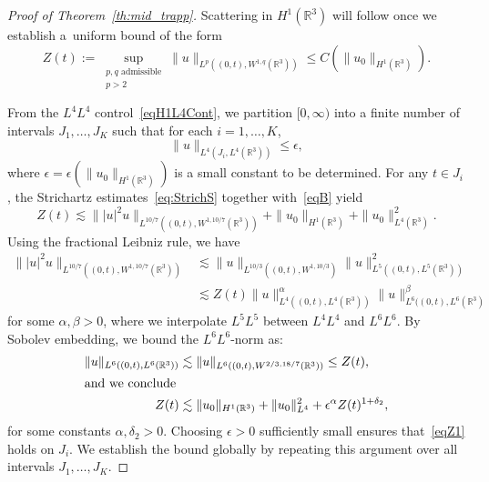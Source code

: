 \documentclass[AHL,Unicode,longabstracts,published]{cedram}
\newcommand*\R{\mathbb{R}}
\begin{document}
\begin{proof}[Proof of Theorem~\ref{th:mid_trapp}]
Scattering in $H^1(\R^3) $ will follow once we establish a~uniform bound of the form
\begin{equation}\label{eqZ1}
Z(t) := \sup_{\substack{p, q \text{ admissible}\\ p>2}} \| u \|_{L^p\left((0,t), W^{1,q}(\R^3)\right)} \leq C\left(\| u_0 \|_{H^1(\R^3)}\right).
\end{equation}

From the $L^4L^4$ control~\eqref{eqH1L4Cont}, we partition $[0, \infty)$ into a finite number of intervals $J_1, \dots, J_K $ such that for each $i = 1, \dots, K $,
\begin{equation*}
\| u \|_{L^4(J_i, L^4(\R^3))} \leq \epsilon,
\end{equation*}
where $\epsilon = \epsilon(\| u_0 \|_{H^1(\R^3)})$ is a small constant to be determined. For any $t \in J_i $, the Strichartz estimates~\eqref{eq:StrichS} together with~\eqref{eqB} yield
\begin{equation*}
Z(t) \lesssim \| |u|^2 u \|_{L^{10/7}\left((0,t), W^{1,10/7}(\R^3)\right)} + \| u_0 \|_{H^1(\R^3)} + \| u_0 \|_{L^4(\R^3)}^2.
\end{equation*}
Using the fractional Leibniz rule, we have
\begin{align*}
\| |u|^2 u \|_{L^{10/7}\left((0,t), W^{1,10/7}(\R^3)\right)} & \lesssim \| u \|_{L^{10/3}\left((0,t), W^{1,10/3}\right)} \| u \|_{L^5\left((0,t), L^5(\R^3)\right)}^2 \\
&\lesssim Z(t) \| u \|_{L^4\left((0,t), L^4(\R^3)\right)}^\alpha \| u \|_{L^6((0,t), L^6(\R^3)}^\beta
\end{align*}
for some $\alpha, \beta > 0$, where we interpolate $L^5L^5 $ between $L^4L^4 $ and $L^6L^6 $. By Sobolev embedding, we bound the $L^6L^6 $-norm as:
\begin{align*}
\| u \|_{L^6((0,t), L^6(\R^3))} &\lesssim \| u \|_{L^6((0,t), W^{2/3,18/7}(\R^3))} \leq Z(t),
\\
\intertext{and we conclude}
Z(t) &\lesssim \| u_0 \|_{H^1(\R^3)} + \| u_0 \|_{L^4}^2+ \epsilon^\alpha Z(t)^{1+\delta_2},
\end{align*}
for some constants $\alpha, \delta_2 > 0$. Choosing $\epsilon > 0$ sufficiently small ensures that~\eqref{eqZ1} holds on $J_i $. We establish the bound globally by repeating this argument over all intervals $J_1, \dots, J_K $.


\end{proof}
\end{document}
